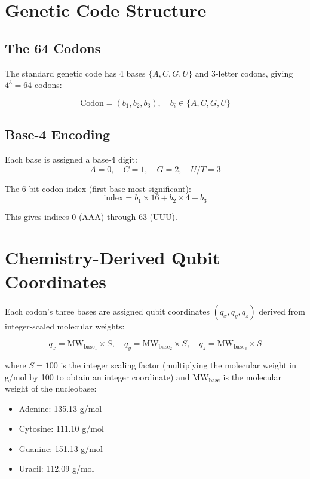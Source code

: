 \documentclass[11pt]{article}
\begin{document}
\section{Genetic Code Structure}

\subsection{The 64 Codons}

The standard genetic code has 4 bases $\{A, C, G, U\}$ and 3-letter codons, giving $4^3 = 64$ codons:

\begin{equation}
\text{Codon} = (b_1, b_2, b_3), \quad b_i \in \{A, C, G, U\}
\end{equation}

\subsection{Base-4 Encoding}

Each base is assigned a base-4 digit:
\begin{equation}
A = 0, \quad C = 1, \quad G = 2, \quad U/T = 3
\end{equation}

The 6-bit codon index (first base most significant):
\begin{equation}
\text{index} = b_1 \times 16 + b_2 \times 4 + b_3
\end{equation}

This gives indices $0$ (AAA) through $63$ (UUU).

\section{Chemistry-Derived Qubit Coordinates}

Each codon's three bases are assigned qubit coordinates $(q_x, q_y, q_z)$ derived from integer-scaled molecular weights:

\begin{equation}
q_x = \text{MW}_{\text{base}_1} \times S, \quad q_y = \text{MW}_{\text{base}_2} \times S, \quad q_z = \text{MW}_{\text{base}_3} \times S
\end{equation}

where $S = 100$ is the integer scaling factor (multiplying the molecular weight in g/mol by 100 to obtain an integer coordinate) and $\text{MW}_{\text{base}}$ is the molecular weight of the nucleobase:
\begin{itemize}
\item Adenine: 135.13 g/mol
\item Cytosine: 111.10 g/mol
\item Guanine: 151.13 g/mol
\item Uracil: 112.09 g/mol
\end{itemize}
\end{document}

